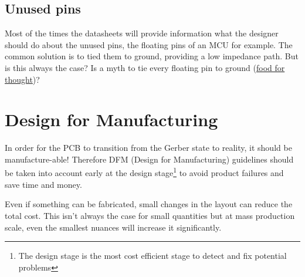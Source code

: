 \documentclass[12pt]{article}
\begin{document}
\subsection{Unused pins}

Most of the times the datasheets will provide information what the designer should do about the unused pins, the floating pins of an MCU for example. The common solution is to tied them to ground, providing a low impedance path. But is this always the case? Is a myth to tie every floating pin to ground (\href{https://learnemc.com/not-so-good-emc-design-guidelines}{food for thought})?





\section{Design for Manufacturing}

In order for the PCB to transition from the Gerber state to reality, it should be manufacture-able! Therefore DFM (Design for Manufacturing) guidelines should be taken into account early at the design stage\footnote{The design stage is the most cost efficient stage to detect and fix potential problems} to avoid product failures and save time and money. 

Even if something can be fabricated, small changes in the layout can reduce the total cost. This isn't always the case for small quantities but at mass production scale, even the smallest nuances will increase it significantly. 
\end{document}
